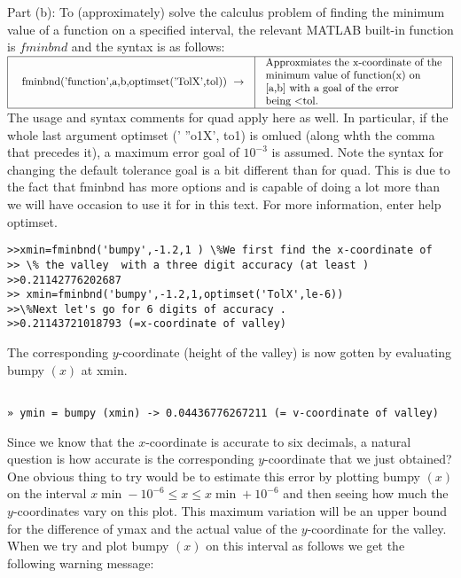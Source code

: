 \documentclass[../main.tex]{subfiles}
\begin{document}
Part (b): To (approximately) solve the calculus problem of finding the minimum value of a function on a specified interval, the relevant MATLAB built-in function is $fminbnd$ and the syntax is as follows:
\\
$
\begin{array}{|l|l|}
\hline \begin{array}{l}
\text { fminbnd('function',a,b,optimset('TolX',tol)) } \rightarrow \\
\end{array} & \begin{array}{l}
\text {Approxmiates the x-coordinate of the}\\
\text {minimum value of function(x) on}\\
\text{{[}a,b{]} with a goal of the error}\\
\text{being \textless{}tol.}
\end{array} \\
\hline
\end{array}
$\\

The usage and syntax comments for quad apply here as well. In particular, if the whole last argument optimset (' ''o1X', to1) is omlued (along whth the comma that precedes it), a maximum error goal of $10^{-3}$ is assumed. Note the syntax for changing the default tolerance goal is a bit different than for quad. This is due to the fact that fminbnd has more options and is capable of doing a lot more than we will have occasion to use it for in this text. For more information, enter help optimset.

\begin{verbatim}
>>xmin=fminbnd('bumpy',-1.2,1 ) \%We first find the x-coordinate of 
>> \% the valley  with a three digit accuracy (at least ) 
>>0.21142776202687 
>> xmin=fminbnd('bumpy',-1.2,1,optimset('TolX',le-6))  
>>\%Next let's go for 6 digits of accuracy . 
>>0.21143721018793 (=x-coordinate of valley) 

\end{verbatim}

The corresponding $y$-coordinate (height of the valley) is now gotten by evaluating bumpy $(x)$ at xmin. 

\begin{verbatim}

» ymin = bumpy (xmin) -> 0.04436776267211 (= v-coordinate of valley)

\end{verbatim}

Since we know that the $x$-coordinate is accurate to six decimals, a natural question is how accurate is the corresponding $y$-coordinate that we just obtained? One obvious thing to try would be to estimate this error by plotting bumpy $(x)$ on the interval $x \min -10^{-6} \leq x \leq x \min +10^{-6}$ and then seeing how much the $y$-coordinates vary on this plot. This maximum variation will be an upper bound for the difference of ymax and the actual value of the $y$-coordinate for the valley. When we try and plot bumpy $(x)$ on this interval as follows we get the following warning message:
\end{document}
